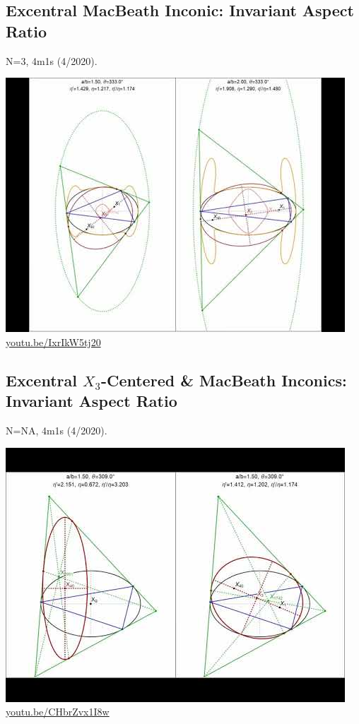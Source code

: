 \documentclass[12pt]{amsart}
\begin{document}
\subsection{Excentral MacBeath Inconic: Invariant Aspect Ratio}
\label{vid:IxrIkW5tj20}
\noindent N=3, 4m1s (4/2020). 
\begin{center}\includegraphics[width=.5\textwidth]{pics/IxrIkW5tj20.jpg} \\ 
\href{https://youtu.be/IxrIkW5tj20}{\url{youtu.be/IxrIkW5tj20}}\end{center}
% 

\subsection{Excentral $X_{3}$-Centered \& MacBeath Inconics: Invariant Aspect Ratio}
\label{vid:CHbrZvx1I8w}
\noindent N=NA, 4m1s (4/2020). 
\begin{center}\includegraphics[width=.5\textwidth]{pics/CHbrZvx1I8w.jpg} \\ 
\href{https://youtu.be/CHbrZvx1I8w}{\url{youtu.be/CHbrZvx1I8w}}\end{center}
% 
\end{document}
